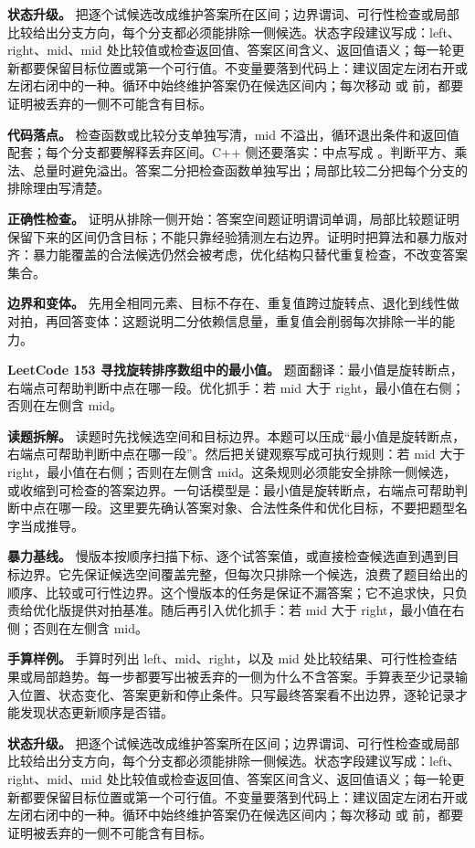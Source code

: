 \textbf{状态升级。} 把逐个试候选改成维护答案所在区间；边界谓词、可行性检查或局部比较给出分支方向，每个分支都必须能排除一侧候选。状态字段建议写成：left、right、mid、mid 处比较值或检查返回值、答案区间含义、返回值语义；每一轮更新都要保留目标位置或第一个可行值。不变量要落到代码上：建议固定左闭右开或左闭右闭中的一种。循环中始终维护答案仍在候选区间内；每次移动  或  前，都要证明被丢弃的一侧不可能含有目标。

\textbf{代码落点。} 检查函数或比较分支单独写清，mid 不溢出，循环退出条件和返回值配套；每个分支都要解释丢弃区间。C++ 侧还要落实：中点写成 。判断平方、乘法、总量时避免溢出。答案二分把检查函数单独写出；局部比较二分把每个分支的排除理由写清楚。

\textbf{正确性检查。} 证明从排除一侧开始：答案空间题证明谓词单调，局部比较题证明保留下来的区间仍含目标；不能只靠经验猜测左右边界。证明时把算法和暴力版对齐：暴力能覆盖的合法候选仍然会被考虑，优化结构只替代重复检查，不改变答案集合。

\textbf{边界和变体。} 先用全相同元素、目标不存在、重复值跨过旋转点、退化到线性做对拍，再回答变体：这题说明二分依赖信息量，重复值会削弱每次排除一半的能力。

\noindent\textbf{LeetCode 153 寻找旋转排序数组中的最小值。} 题面翻译：最小值是旋转断点，右端点可帮助判断中点在哪一段。优化抓手：若 mid 大于 right，最小值在右侧；否则在左侧含 mid。

\textbf{读题拆解。} 读题时先找候选空间和目标边界。本题可以压成“最小值是旋转断点，右端点可帮助判断中点在哪一段”。然后把关键观察写成可执行规则：若 mid 大于 right，最小值在右侧；否则在左侧含 mid。这条规则必须能安全排除一侧候选，或收缩到可检查的答案边界。一句话模型是：最小值是旋转断点，右端点可帮助判断中点在哪一段。这里要先确认答案对象、合法性条件和优化目标，不要把题型名字当成推导。

\textbf{暴力基线。} 慢版本按顺序扫描下标、逐个试答案值，或直接检查候选直到遇到目标边界。它先保证候选空间覆盖完整，但每次只排除一个候选，浪费了题目给出的顺序、比较或可行性边界。这个慢版本的任务是保证不漏答案；它不追求快，只负责给优化版提供对拍基准。随后再引入优化抓手：若 mid 大于 right，最小值在右侧；否则在左侧含 mid。

\textbf{手算样例。} 手算时列出 left、mid、right，以及 mid 处比较结果、可行性检查结果或局部趋势。每一步都要写出被丢弃的一侧为什么不含答案。手算表至少记录输入位置、状态变化、答案更新和停止条件。只写最终答案看不出边界，逐轮记录才能发现状态更新顺序是否错。

\textbf{状态升级。} 把逐个试候选改成维护答案所在区间；边界谓词、可行性检查或局部比较给出分支方向，每个分支都必须能排除一侧候选。状态字段建议写成：left、right、mid、mid 处比较值或检查返回值、答案区间含义、返回值语义；每一轮更新都要保留目标位置或第一个可行值。不变量要落到代码上：建议固定左闭右开或左闭右闭中的一种。循环中始终维护答案仍在候选区间内；每次移动  或  前，都要证明被丢弃的一侧不可能含有目标。

